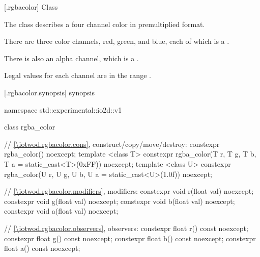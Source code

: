  [\iotwod.rgbacolor] {Class }

\pnum
{}%
The class  describes a four channel color in premultiplied format.

\pnum
There are three color channels, red, green, and blue, each of which is a .

\pnum
There is also an alpha channel, which is a .

\pnum
Legal values for each channel are in the range .

%
 [\iotwod.rgbacolor.synopsis] { synopsis}

\begin{codeblock}
namespace std::experimental::io2d::v1 {
  class rgba_color {
    // \ref{\iotwod.rgbacolor.cons}, construct/copy/move/destroy:
    constexpr rgba_color() noexcept;
    template <class T>
    constexpr rgba_color(T r, T g, T b, T a = static_cast<T>(0xFF)) noexcept;
    template <class U>
    constexpr rgba_color(U r, U g, U b, U a = static_cast<U>(1.0f)) noexcept;
  
    // \ref{\iotwod.rgbacolor.modifiers}, modifiers:
    constexpr void r(float val) noexcept;
    constexpr void g(float val) noexcept;
    constexpr void b(float val) noexcept;
    constexpr void a(float val) noexcept;
    
    // \ref{\iotwod.rgbacolor.observers}, observers:
    constexpr float r() const noexcept;
    constexpr float g() const noexcept;
    constexpr float b() const noexcept;
    constexpr float a() const noexcept;
    
}}
\end{codeblock}

